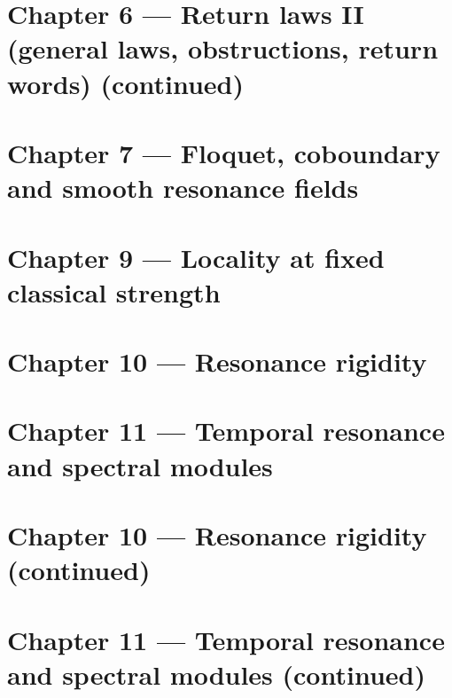 \documentclass[11pt,a4paper]{article}
\numberwithin{equation}{section}
\begin{document}
\part*{Chapter 6 --- Return laws II (general laws, obstructions, return words) (continued)}


\part*{Chapter 7 --- Floquet, coboundary and smooth resonance fields}







\part*{Chapter 9 --- Locality at fixed classical strength}

\part*{Chapter 10 --- Resonance rigidity}






\part*{Chapter 11 --- Temporal resonance and spectral modules}

\part*{Chapter 10 --- Resonance rigidity (continued)}

\part*{Chapter 11 --- Temporal resonance and spectral modules (continued)}

\end{document}
